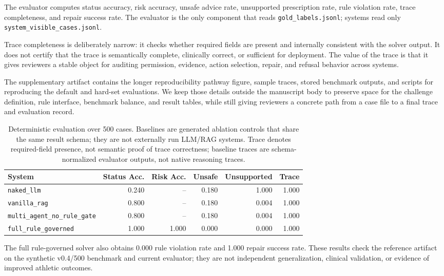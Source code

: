 \documentclass{ceurart}
\begin{document}
The evaluator computes status accuracy, risk accuracy, unsafe advice rate, unsupported prescription rate, rule violation rate, trace completeness, and repair success rate. The evaluator is the only component that reads \texttt{gold\_labels.jsonl}; systems read only \texttt{system\_visible\_cases.jsonl}.

Trace completeness is deliberately narrow: it checks whether required fields are present and internally consistent with the solver output. It does not certify that the trace is semantically complete, clinically correct, or sufficient for deployment. The value of the trace is that it gives reviewers a stable object for auditing permission, evidence, action selection, repair, and refusal behavior across systems.

The supplementary artifact contains the longer reproducibility pathway figure, sample traces, stored benchmark outputs, and scripts for reproducing the default and hard-set evaluations. We keep those details outside the manuscript body to preserve space for the challenge definition, rule interface, benchmark balance, and result tables, while still giving reviewers a concrete path from a case file to a final trace and evaluation record.

\begin{table}[tbp]
\centering
\caption{Deterministic evaluation over 500 cases. Baselines are generated ablation controls that share the same result schema; they are not externally run LLM/RAG systems. Trace denotes required-field presence, not semantic proof of trace correctness; baseline traces are schema-normalized evaluator outputs, not native reasoning traces.}
\label{tab:results}
\begin{tabular}{lrrrrr}
\toprule
System & Status Acc. & Risk Acc. & Unsafe & Unsupported & Trace \\
\midrule
\texttt{naked\_llm} & 0.240 & -- & 0.180 & 1.000 & 1.000 \\
\texttt{vanilla\_rag} & 0.800 & -- & 0.180 & 0.004 & 1.000 \\
\texttt{multi\_agent\_no\_rule\_gate} & 0.800 & -- & 0.180 & 0.004 & 1.000 \\
\texttt{full\_rule\_governed} & 1.000 & 1.000 & 0.000 & 0.000 & 1.000 \\
\bottomrule
\end{tabular}
\end{table}

The full rule-governed solver also obtains 0.000 rule violation rate and 1.000 repair success rate. These results check the reference artifact on the synthetic v0.4/500 benchmark and current evaluator; they are not independent generalization, clinical validation, or evidence of improved athletic outcomes.
\end{document}
